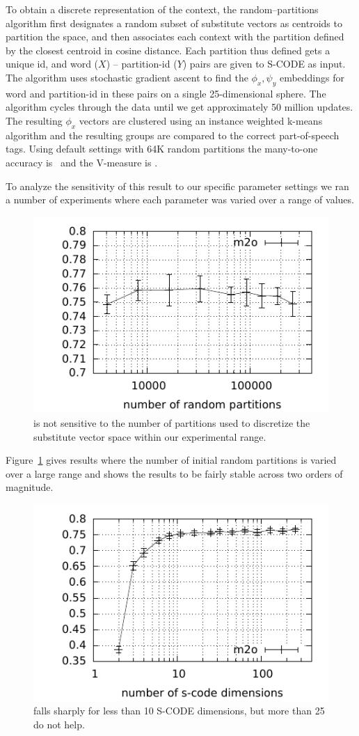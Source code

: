 To obtain a discrete representation of the context, the
random--partitions algorithm first designates a random subset of
substitute vectors as centroids to partition the space, and then
associates each context with the partition defined by the closest
centroid in cosine distance.  Each partition thus defined gets a
unique id, and word ($X$) -- partition-id ($Y$) pairs are given to
S-CODE as input.  The algorithm uses stochastic gradient ascent to
find the $\phi_x, \psi_y$ embeddings for word and partition-id in
these pairs on a single 25-dimensional sphere.  The algorithm cycles
through the data until we get approximately 50 million updates.  The
resulting $\phi_x$ vectors are clustered using an instance weighted
k-means algorithm and the resulting groups are compared to the correct
part-of-speech tags.  Using default settings with 64K random
partitions the many-to-one accuracy is \rpmto\ and the V-measure is
\rpvm.

To analyze the sensitivity of this result to our specific parameter
settings we ran a number of experiments where each parameter was
varied over a range of values.

\begin{figure}[ht] \centering
\includegraphics[width=0.5\linewidth]{plot-p.pdf}
\caption{\mto is not sensitive to the number of partitions used to
  discretize the substitute vector space within our experimental
  range.}
\label{plot-p}
\end{figure}

Figure~\ref{plot-p} gives results where the number of initial random
partitions is varied over a large range and shows the results to be
fairly stable across two orders of magnitude.

\begin{figure}[ht] \centering
\includegraphics[width=0.5\linewidth]{plot-d.pdf}
\caption{\mto falls sharply for less than 10 S-CODE dimensions, but
  more than 25 do not help.}
\label{plot-d}
\end{figure}

